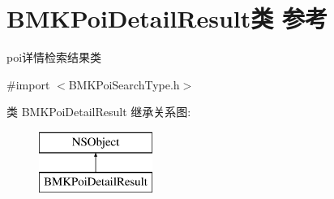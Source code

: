 \hypertarget{interface_b_m_k_poi_detail_result}{\section{B\+M\+K\+Poi\+Detail\+Result类 参考}
\label{interface_b_m_k_poi_detail_result}
}


poi详情检索结果类  




{\ttfamily \#import $<$B\+M\+K\+Poi\+Search\+Type.\+h$>$}

类 B\+M\+K\+Poi\+Detail\+Result 继承关系图\+:\begin{figure}[H]
\begin{center}
\leavevmode
\includegraphics[height=2.000000cm]{interface_b_m_k_poi_detail_result}
\end{center}
\end{figure}
